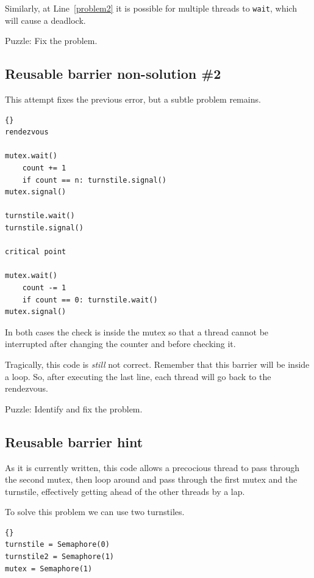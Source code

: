 \documentclass{book}
\newcommand{\clearemptydoublepage}{\newpage\cleardoublepage}
\begin{document}
Similarly, at Line~\ref{problem2} it is possible for multiple
threads to {\tt wait}, which will cause a deadlock.

Puzzle: Fix the problem.

\clearemptydoublepage
\subsection {Reusable barrier non-solution \#2}

This attempt fixes the previous error, but a subtle problem
remains.

\begin{latin}
\begin{latin}
\begin{lstlisting}[title={Reusable barrier non-solution}]{}
rendezvous

mutex.wait()
    count += 1
    if count == n: turnstile.signal()
mutex.signal()

turnstile.wait()
turnstile.signal()

critical point

mutex.wait()
    count -= 1
    if count == 0: turnstile.wait()
mutex.signal()
\end{lstlisting}
\end{latin}
\end{latin}

In both cases the check is inside the mutex so that
a thread cannot be interrupted after changing the counter
and before checking it.

Tragically, this code is {\em still} not correct.
Remember that this barrier will be inside a loop.  So, after
executing the last line, each thread will go back
to the rendezvous.

Puzzle: Identify and fix the problem.


\clearemptydoublepage
\subsection {Reusable barrier hint}

As it is currently written, this code
allows a precocious thread to pass through the second mutex,
then loop around and pass through the first mutex and the
turnstile, effectively getting ahead of the other threads by
a lap.

To solve this problem we can use two turnstiles.

\begin{latin}
\begin{latin}
\begin{lstlisting}[title={Reusable barrier hint}]{}
turnstile = Semaphore(0)
turnstile2 = Semaphore(1)
mutex = Semaphore(1)
\end{lstlisting}
\end{latin}
\end{latin}
\end{document}
